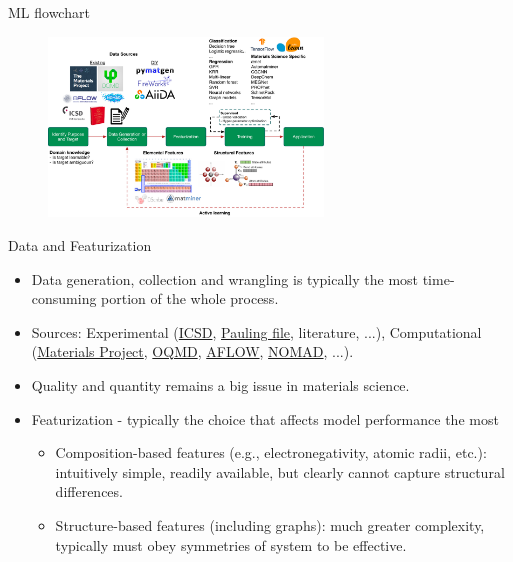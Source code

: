 \documentclass[aspectratio=169]{beamer}
\begin{document}
\begin{frame}{ML flowchart}
\begin{figure}
    \centering
    \includegraphics[width=0.65\textwidth]{figures/ml_flowchart.pdf}
\end{figure}
\end{frame}


\begin{frame}{Data and Featurization}
    \begin{itemize}
        \item Data generation, collection and wrangling is typically the most time-consuming portion of the whole process.
        \item Sources: Experimental (\href{http://icsd.fiz-karlsruhe.de/icsd/}{ICSD}, \href{http://paulingfile.com/}{Pauling file}, literature, ...), Computational (\href{http://www.materialsproject.org}{Materials Project}, \href{http://oqmd.org/}{OQMD}, \href{http://aflowlib.org/}{AFLOW}, \href{https://nomad-coe.eu/}{NOMAD}, ...).
        \item Quality and quantity remains a big issue in materials science.
        \item Featurization - typically the choice that affects model performance the most
        \begin{itemize}
            \item Composition-based features (e.g., electronegativity, atomic radii, etc.): intuitively simple, readily available, but clearly cannot capture structural differences.
            \item Structure-based features (including graphs): much greater complexity, typically must obey symmetries of system to be effective.
        \end{itemize}
    \end{itemize}
\end{frame}
\end{document}
